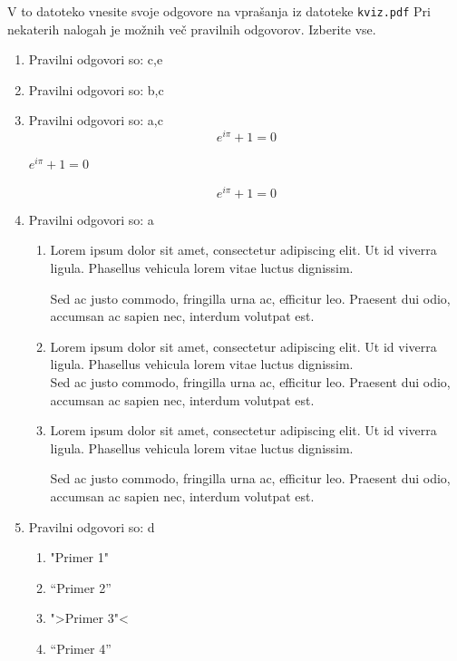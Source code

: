 \documentclass[11pt]{article}
\begin{document}
V to datoteko vnesite svoje odgovore na vprašanja iz datoteke \texttt{kviz.pdf}
Pri nekaterih nalogah je možnih več pravilnih odgovorov. Izberite vse.

\begin{enumerate}
    \item Pravilni odgovori so: c,e%
    
    \item Pravilni odgovori so: b,c%
    
    \item Pravilni odgovori so: a,c%
      \[ e^{i \pi} + 1 = 0 \]
      \begin{center}
          \( e^{i \pi} + 1 = 0 \)
      \end{center}
      \begin{equation*}
          e^{i \pi} + 1 = 0
      \end{equation*}

    \item Pravilni odgovori so: a%
        \begin{enumerate}
            \item {
Lorem ipsum dolor sit amet, consectetur adipiscing 
elit. Ut id viverra ligula. Phasellus vehicula lorem 
vitae luctus dignissim. 
                
Sed ac justo commodo, fringilla urna ac, efficitur 
leo. Praesent dui odio, accumsan ac sapien nec, 
interdum volutpat est. 
            }
            \item {
Lorem ipsum dolor sit amet, consectetur adipiscing 
elit. Ut id viverra ligula. Phasellus vehicula lorem 
vitae luctus dignissim. \\
Sed ac justo commodo, fringilla urna ac, efficitur 
leo. Praesent dui odio, accumsan ac sapien nec, 
interdum volutpat est.             }
            \item {
Lorem ipsum dolor sit amet, consectetur adipiscing 
elit. Ut id viverra ligula. Phasellus vehicula lorem 
vitae luctus dignissim. \par
Sed ac justo commodo, fringilla urna ac, efficitur 
leo. Praesent dui odio, accumsan ac sapien nec, 
interdum volutpat est.             }
        \end{enumerate}
    
      \item Pravilni odgovori so: d%
        \begin{enumerate}
          \item "Primer 1"
          \item ``Primer 2''
          \item ">Primer 3"<
          \item "`Primer 4"'
        \end{enumerate}


\end{enumerate}
\end{document}
